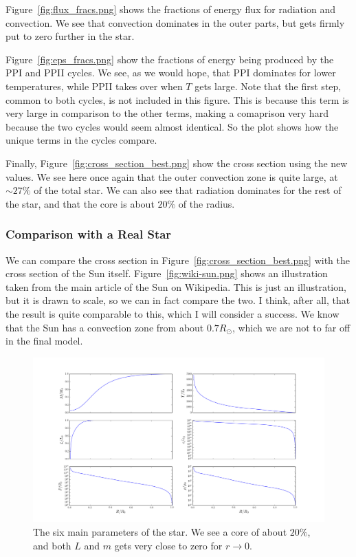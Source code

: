 \documentclass[11pt]{article}
\begin{document}
Figure~\ref{fig:flux_fracs.png} shows the fractions of energy flux for radiation and convection. We see that convection dominates in the outer parts, but gets firmly put to zero further in the star.

Figure~\ref{fig:eps_fracs.png} show the fractions of energy being produced by the PPI and PPII cycles. We see, as we would hope, that PPI dominates for lower temperatures, while PPII takes over when $T$ gets large. Note that the first step, common to both cycles, is not included in this figure. This is because this term is very large in comparison to the other terms, making a comaprison very hard because the two cycles would seem almost identical. So the plot shows how the unique terms in the cycles compare. 

Finally, Figure~\ref{fig:cross_section_best.png} show the cross section using the new values. We see here once again that the outer convection zone is quite large, at $\sim 27\%$ of the total star. We can also see that radiation dominates for the rest of the star, and that the core is about $20\%$ of the radius. 

\subsubsection{Comparison with a Real Star}

We can compare the cross section in Figure~\ref{fig:cross_section_best.png} with the cross section of the Sun itself. Figure~\ref{fig:wiki-sun.png} shows an illustration taken from the main article of the Sun on Wikipedia. This is just an illustration, but it is drawn to scale, so we can in fact compare the two. I think, after all, that the result is quite comparable to this, which I will consider a success. We know that the Sun has a convection zone from about $0.7R_\odot$, which we are not to far off in the final model.  


\begin{figure}
    \center
    \includegraphics[width=\linewidth]{fig/main_params.png}
    \caption{\label{fig:main_params.png} The six main parameters of the star. We see a core of about $20\%$, and both $L$ and $m$ gets very close to zero for $r\rightarrow 0$. }
\end{figure}
\end{document}
